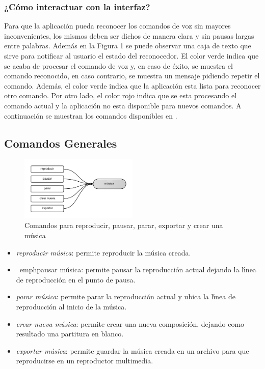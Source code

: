 \subsubsection{¿C\'omo interactuar con la interfaz?}
Para que la aplicaci\'on pueda reconocer los comandos de voz sin mayores inconvenientes, los mismos
deben ser dichos de manera clara y sin pausas largas entre palabras. Adem\'as en la Figura 1 se puede
observar una caja de texto que sirve para notificar al usuario el estado del reconocedor. El color verde
indica que se acaba de procesar el comando  de voz   y,  en caso de  \'exito, se muestra el comando
reconocido, en caso contrario, se muestra un mensaje pidiendo repetir el comando.  Adem\'as, el color
verde indica que la aplicaci\'on esta lista para reconocer otro comando. Por otro lado, el color rojo indica
que se esta procesando el comando actual y la aplicaci\'on no esta disponible para nuevos comandos.
A continuaci\'on se muestran los comandos disponibles en .

\subsection{Comandos Generales}

\begin{figure}[H] 
\centering
\includegraphics[width=0.5\textwidth]{./graphics/cmd-musica.png}
\caption{Comandos para reproducir, pausar, parar, exportar y crear una m\'usica}
\label{figure:cmd-crear-musica-anexo}
\end{figure}

\begin{itemize}
\item \emph{reproducir m\'usica}: permite reproducir la m\'usica creada.
\item \ emph{pausar m\'usica}: permite pausar la reproducci\'on actual dejando la l{\'\i}nea de reproducci\'on en el
punto de pausa.
\item \emph{parar m\'usica}: permite parar la reproducci\'on actual y ubica la l{\'\i}nea de reproducci\'on al inicio de
la m\'usica.
\item \emph{crear nueva m\'usica}:  permite crear una nueva composici\'on, dejando como resultado una
partitura en blanco.
\item \emph{exportar m\'usica}: permite guardar la m\'usica creada en un archivo para que reproducirse en un
reproductor multimedia.
\end{itemize}

